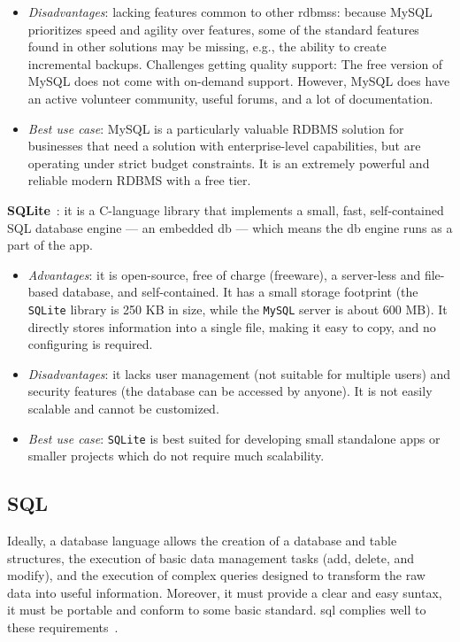 \begin{item-c}
\begin{itemize}
      highly compatible with many other database systems.
    \item \emph{Disadvantages}: lacking features common to other \glspl{rdbms}:
      because MySQL prioritizes speed and agility over features, some of the
      standard features found in other solutions may be missing, e.g., the
      ability to create incremental backups. Challenges getting quality support:
      The free version of MySQL does not come with on-demand support. However,
      MySQL does have an active volunteer community, useful forums, and a lot of
      documentation.
    \item \emph{Best use case}: MySQL is a particularly valuable RDBMS solution
      for businesses that need a solution with enterprise-level capabilities,
      but are operating under strict budget constraints. It is an extremely
      powerful and reliable modern RDBMS with a free tier.
  \end{itemize}
\item \textbf{SQLite}~\cite{MysqlVsSqlite}: it is a C-language library that
  implements a small, fast, self-contained SQL database engine --- 
  an embedded \gls{db} --- which means the \gls{db} engine runs as a part of the
  app.
    \begin{itemize}
    \item \emph{Advantages}: it is open-source, free of charge (freeware), a
      server-less and file-based database, and self-contained. It has a small
      storage footprint (the \texttt{SQLite} library is 250 KB in size, while the \texttt{MySQL}
      server is about 600 MB). It directly stores information into a single
      file, making it easy to copy, and no configuring is required.
    \item \emph{Disadvantages}: it lacks user management (not suitable for
      multiple users) and security features (the database can be accessed by
      anyone). It is not easily scalable and cannot be customized.
    \item \emph{Best use case}: \texttt{SQLite} is best suited for developing
      small standalone apps or smaller projects which do not require much
      scalability.
  \end{itemize}
\end{item-c}
%
\subsection{SQL}%
\label{sec:sql}
Ideally, a database language allows the creation of a database and table
structures, the execution of basic data management tasks (add, delete, and
modify), and the execution of complex queries designed to transform the raw data
into useful information. Moreover, it must provide a clear and easy suntax, it
must be portable and conform to some basic standard. \gls{sql} complies well to
these requirements~\cite{coronel2016database}.


